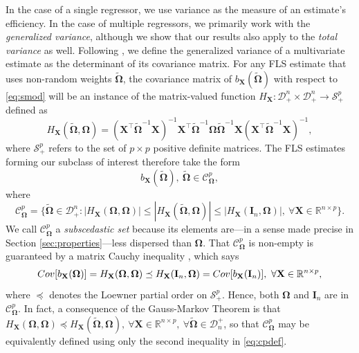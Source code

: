 \documentclass[12pt]{article}
\newcommand{\Cov}[1]{{\rm{Cov}}[ #1 ]}
\newcommand{\bl}[1]{{\mathbf #1}}
\newcommand{\bs}[1]{\boldsymbol #1}
\begin{document}
{In the case of a single regressor, we use variance as the measure of an estimate's efficiency. In the case of multiple regressors, we primarily work with the \textit{generalized variance}, although we show that our results also apply to the \textit{total variance} as well}. Following \cite{bloomfield_inefficiency_1975}, we define the generalized variance of a multivariate estimate as the determinant of its covariance matrix. For any FLS estimate that uses non-random weights $\tilde{\bs{\Omega}}$, the covariance matrix of $b_{\bl{X}}(\tilde{\bs{\Omega}})$ with respect to \eqref{eq:smod} will be an instance of the matrix-valued function $H_{\bl{X}} : \mathcal{D}_+^{n} \times \mathcal{D}_+^{n} \rightarrow \mathcal{S}_+^p$ defined as
\begin{equation}\label{eq:hform}
    H_{\bl{X}}(\tilde{\bs{\Omega}}, \bs{\Omega}) = (\bl{X}^\top \tilde{\bs{\Omega}}^{-1}\bl{X})^{-1} \bl{X}^\top \tilde{\bs{\Omega}}^{-1} \bs{\Omega} \tilde{\bs{\Omega}}^{-1} \bl{X} (\bl{X}^\top \tilde{\bs{\Omega}}^{-1}\bl{X})^{-1},
\end{equation}
where $\mathcal{S}_+^p$ refers to the set of $p \times p$ positive definite matrices. The FLS estimates forming our subclass of interest therefore take the form
\begin{equation*}
    b_{\bl{X}}(\tilde{\bs{\Omega}}),~ \tilde{\bs{\Omega}} \in \mathcal{C}^p_{\bs{\Omega}},
\end{equation*}
where
\begin{equation}\label{eq:cpdef}
    \mathcal{C}^p_{\bs{\Omega}} = \{ \tilde{\bs{\Omega}} \in \mathcal{D}_+^n : | H_{\bl{X}}(\bs{\Omega}, \bs{\Omega})| \leq | H_{\bl{X}}(\tilde{\bs{\Omega}}, \bs{\Omega}) | \leq | H_{\bl{X}}(\bl{I}_n, \bs{\Omega}) |,~\forall \bl{X} \in \mathbb{R}^{n \times p} \}.
\end{equation}
We call $\mathcal{C}^p_{\bs{\Omega}}$ a \textit{subscedastic set} because its elements are---in a sense made precise in Section \ref{sec:properties}---less dispersed than $\bs{\Omega}$. That $\mathcal{C}^p_{\bs{\Omega}}$ is non-empty is guaranteed by a matrix Cauchy inequality \citep{marshall_matrix_1990}, which says
\begin{equation*}
    \Cov{b_{\bl{X}}(\bl{\Omega})} = H_{\bl{X}}(\bs{\Omega}, \bs{\Omega}) \preceq H_{\bl{X}}(\bl{I}_n, \bs{\Omega}) = \Cov{b_{\bl{X}}(\bl{I}_n)},~\forall \bl{X} \in \mathbb{R}^{n \times p},
\end{equation*}
where $\preceq$ denotes the Loewner partial order on $\mathcal{S}_+^p$. Hence, both $\bs{\Omega}$ and $\bl{I}_n$ are in $\mathcal{C}^p_{\bs{\Omega}}$. In fact, a consequence of the Gauss-Markov Theorem \citep{aitken_ivleast_1936} is that $H_{\bl{X}}(\bs{\Omega}, \bs{\Omega}) \preceq H_{\bl{X}}(\tilde{\bs{\Omega}}, \bs{\Omega}),~\forall \bl{X} \in \mathbb{R}^{n \times p},~\forall \tilde{\bs{\Omega}} \in \mathcal{D}_n^+$, so that $\mathcal{C}_{\bs{\Omega}}^p$ may be equivalently defined using only the second inequality in \eqref{eq:cpdef}. 
\end{document}

